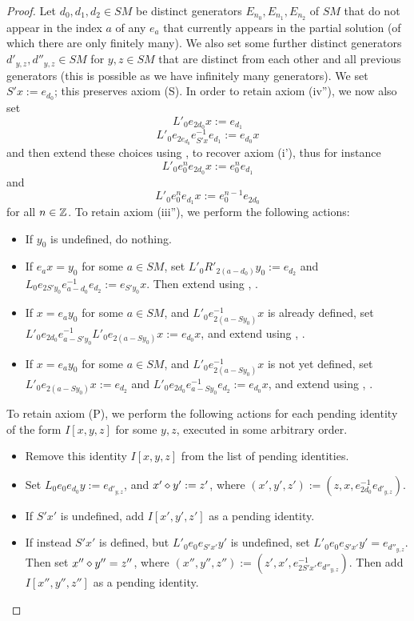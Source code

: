 \begin{proof}
Let $d_0, d_1, d_2 \in SM$ be distinct generators $E_{n_0}, E_{n_1}, E_{n_2}$ of $SM$ that do not appear in the index $a$ of any $e_a$ that currently appears in the partial solution (of which there are only finitely many).  We also set some further distinct generators $d'_{y,z}, d''_{y,z} \in SM$ for $y,z \in SM$ that are distinct from each other and all previous generators (this is possible as we have infinitely many generators).  We set $S'x := e_{d_0}$; this preserves axiom (S).  In order to retain axiom (iv''), we now also set
$$ L'_0 e_{2d_0} x := e_{d_1}$$
$$ L'_0 e_{2e_{d_0}} e_{S'x}^{-1} e_{d_1} := e_{d_0} x$$
and then extend these choices using ,  to recover axiom (i'), thus for instance
$$ L'_0 e_0^n e_{2d_0} x := e_0^n e_{d_1}$$
and
$$ L'_0 e_0^n e_{d_1} x := e_0^{n-1} e_{2d_0}$$
for all $n \in \mathbb{Z}$.  To retain axiom (iii''), we perform the following actions:
\begin{itemize}
\item If $y_0$ is undefined, do nothing.
\item If $e_a x = y_0$ for some $a \in SM$, set $L'_0 R'_{2(a-d_0)} y_0 := e_{d_2}$ and $L_0 e_{2S'y_0} e_{a-d_0}^{-1} e_{d_2} := e_{S'y_0} x$.  Then extend using , .
\item If $x = e_a y_0$ for some $a \in SM$, and $L'_0 e_{2(a-Sy_0)}^{-1} x$ is already defined, set $L'_0 e_{2d_0} e^{-1}_{a-S'y_0} L'_0 e_{2(a-Sy_0)} x :=e_{d_0}x$, and extend using , .
\item If $x = e_a y_0$ for some $a \in SM$, and $L'_0 e_{2(a-Sy_0)}^{-1} x$ is not yet defined, set $L'_0 e_{2(a-Sy_0)} x := e_{d_2}$ and $L'_0 e_{2d_0} e_{a-Sy_0}^{-1} e_{d_2} := e_{d_0} x$, and extend using , .
\end{itemize}
To retain axiom (P), we perform the following actions for each pending identity of the form $I[x,y,z]$ for some $y,z$, executed in some arbitrary order.
\begin{itemize}
\item Remove this identity $I[x,y,z]$ from the list of pending identities.
\item Set $L_0 e_0 e_{d_0} y := e_{d'_{y,z}}$, and $x' \diamond y' := z'$, where $(x',y',z') := (z, x, e_{2d_0}^{-1} e_{d'_{y,z}})$.
\item If $S'x'$ is undefined, add $I[x',y',z']$ as a pending identity.
\item If instead $S'x'$ is defined, but $L'_0 e_0 e_{S'x'} y'$ is undefined, set $L'_0 e_0 e_{S'x'} y' = e_{d''_{y,z}}$.  Then set $x'' \diamond y'' = z''$, where $(x'',y'',z'') := (z', x', e_{2S'x'}^{-1} e_{d''_{y,z}})$.  Then add $I[x'',y'',z'']$ as a pending identity.

\end{itemize}
\end{proof}

